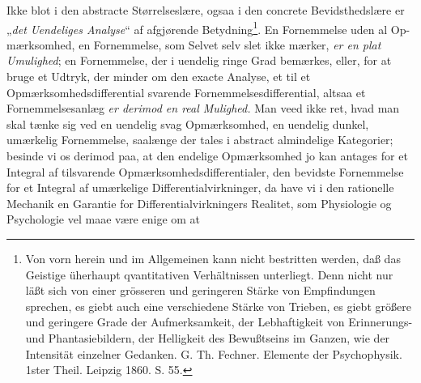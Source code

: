 \documentclass[12pt,a4paper]{book}
\begin{document}
Ikke blot i den abstracte Størrelseslære, ogsaa i den concrete Bevidsthedslære
er „\emph{det Uendeliges Analyse}“ af afgjørende
Betydning\footnote{Von vorn herein und im Allgemeinen kann nicht bestritten
werden, daß das Geistige üherhaupt qvantitativen Verhältnissen unterliegt.
Denn nicht nur läßt sich von einer grösseren und geringeren Stärke von
Empfindungen sprechen, es giebt auch eine verschiedene Stärke von Trieben, es
giebt größere und geringere Grade der Aufmerksamkeit, der Lebhaftigkeit von
Erinnerungs- und Phantasiebildern, der Helligkeit des Bewußtseins im Ganzen, wie
der Intensität einzelner Gedanken. G. Th. Fechner. Elemente der Psychophysik.
1ster Theil. Leipzig 1860. S. 55.}. En Fornemmelse uden al Op-
\setcounter{footnote}{0}
mærksomhed, en Fornemmelse, som Selvet selv slet ikke mærker, \emph{er en plat
Umulighed}; en Fornemmelse, der i uendelig ringe Grad bemærkes, eller, for at
bruge et Udtryk, der minder om den exacte Analyse, et til et
Opmærksomhedsdifferential svarende Fornemmelsesdifferential, altsaa et
Fornemmelsesanlæg \emph{er derimod en real Mulighed.} Man veed ikke ret, hvad
man skal tænke sig ved en uendelig svag Opmærksomhed, en uendelig dunkel,
umærkelig Fornemmelse, saalænge der tales i abstract almindelige Kategorier;
besinde vi os derimod paa, at den endelige Opmærksomhed jo kan antages for et
Integral af tilsvarende Opmærksomhedsdifferentialer, den bevidste Fornemmelse
for et Integral af umærkelige Differentialvirkninger, da have vi i den
rationelle Mechanik en Garantie for Differentialvirkningers Realitet, som
Physiologie og Psychologie vel maae være enige om at
\end{document}
